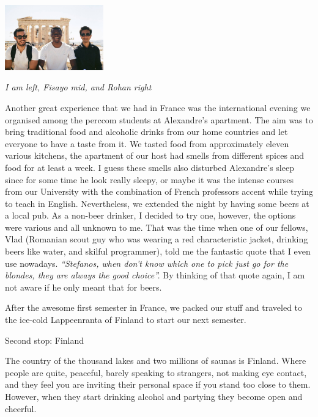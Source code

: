 \documentclass[10pt,a4paper]{article} %
\newcommand{\NewsItem}[1]{ %
\usefont{T1}{fvs}{n}{n} %
\vspace{24pt}\large #1\vspace{3pt} %
\par \normalsize \normalfont}
\begin{document}
\begin{multicols}{3}
\begin{center}
	\includegraphics[width=0.32\textwidth]{media/stef_fisayo_rohan.jpg}
	\par\textit{I am left, Fisayo mid, and Rohan right}
\end{center}


Another great experience that we had in France was the international evening 
we organised among the {\sc perccom} students at Alexandre's apartment. 
The aim was to bring traditional food and alcoholic drinks from our home countries 
and let everyone to have a taste from it. 
We tasted food from approximately eleven various kitchens, the apartment of our 
host had smells from different spices and food for at least a week. 
I guess these smells also disturbed Alexandre's sleep since for some time he look 
really sleepy, or maybe it was the intense courses from our University with the 
combination of French professors accent while trying to teach in English.  
Nevertheless, we extended the night by having some beers at a local pub. 
As a non-beer drinker, I decided to try one, however, the options were various 
and all unknown to me. 
That was the time when one of our fellows, Vlad (Romanian scout guy who was wearing a 
red characteristic jacket, drinking beers like water, and skilful programmer), 
told me the fantastic quote that I even use nowadays. 
\textit{``Stefanos, when don't know which one to pick just go for the blondes, 
	they are always the good choice''.} 
By thinking of that quote again, I am not aware if he only meant that for beers.


After the awesome first semester in France, we packed our stuff and traveled 
to the ice-cold Lappeenranta of Finland to start our next semester.


\NewsItem{Second stop: Finland}

The country of the thousand lakes and two millions of saunas is Finland. 
Where people are quite, peaceful, barely speaking to strangers, not making eye 
contact, and they feel you are inviting their personal space if you stand too 
close to them. 
However, when they start drinking alcohol and partying they become open and cheerful. 
   

\end{multicols}
\end{document}
